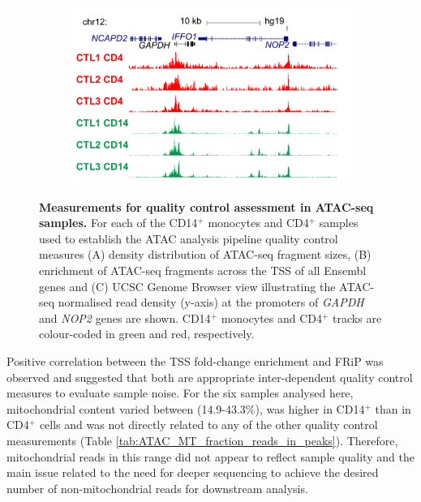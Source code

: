 \begin{figure}[htbp]
\begin{subfigure}[b]{0.6\textwidth}
\centering
\includegraphics[width=\textwidth]{./Results1/pdfs/ATAC_Core_CD4_CD14_fresh_GAPDH}
\caption{\textbf{}} %
\end{subfigure}
\caption[Measurements for quality control assessment in ATAC-seq samples]{\textbf{Measurements for quality control assessment in ATAC-seq samples.} For each of the CD14$^+$ monocytes and CD4$^+$ samples used to establish the ATAC analysis pipeline quality control measures (A) density distribution of ATAC-seq fragment sizes, (B) enrichment of ATAC-seq fragments across the TSS of all Ensembl genes and (C) UCSC Genome Browser view illustrating the ATAC-seq normalised read density (y-axis) at the promoters of \textit{GAPDH} and \textit{NOP2} genes are shown. CD14$^+$ monocytes and CD4$^+$ tracks are colour-coded in green and red, respectively.}
\label{figure:QC_ATAC}
\end{figure} 

Positive correlation between the TSS fold-change enrichment and FRiP was observed and suggested that both are appropriate inter-dependent quality control measures to evaluate sample noise. For the six samples analysed here, mitochondrial content varied between (14.9-43.3\%), was higher in CD14$^+$ than in CD4$^+$ cells and was not directly related to any of the other quality control measurements (Table \ref{tab:ATAC_MT_fraction_reads_in_peaks}). Therefore, mitochondrial reads in this range did not appear to reflect sample quality and the main issue related to the need for deeper sequencing to achieve the desired number of non-mitochondrial reads for downstream analysis.

 

